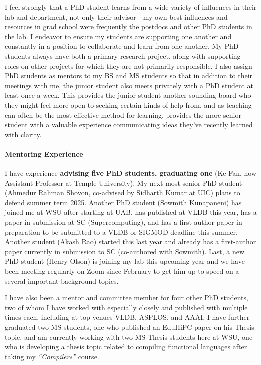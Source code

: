 \documentclass[12pt]{article}
\begin{document}
I feel strongly that a PhD student learns from a wide variety of influences in their lab and department, not only their advisor---my own best influences and resources in grad school were frequently the postdocs and other PhD students in the lab. I endeavor to ensure my students are supporting one another and constantly in a position to collaborate and learn from one another. My PhD students always have both a primary research project, along with supporting roles on other projects for which they are not primarily responsible. I also assign PhD students as mentors to my BS and MS students so that in addition to their meetings with me, the junior student also meets privately with a PhD student at least once a week. This provides the junior student another sounding board who they might feel more open to seeking certain kinds of help from, and as teaching can often be the most effective method for learning, provides the more senior student with a valuable experience communicating ideas they've recently learned with clarity.%

\paragraph{Mentoring Experience}

I have experience \textbf{advising five PhD students, graduating one} (Ke Fan, now Assistant Professor at Temple University). My next most senior PhD student (Ahmedur Rahman Shovon, co-advised by Sidharth Kumar at UIC) plans to defend summer term 2025. Another PhD student (Sowmith Kunapaneni) has joined me at WSU after starting at UAB, has published at VLDB this year, has a paper in submission at SC (Supercomputing), and has a first-author paper in preparation to be submitted to a VLDB or SIGMOD deadline this summer. Another student (Akash Rao) started this last year and already has a first-author paper currently in submission to SC (co-authored with Sowmith). Last, a new PhD student (Henry Olson) is joining my lab this upcoming year and we have been meeting regularly on Zoom since February to get him up to speed on a several important background topics.

I have also been a mentor and committee member for four other PhD students, two of whom I have worked with especially closely and published with multiple times each, including at top venues VLDB, ASPLOS, and AAAI. I have further graduated two MS students, one who published an EduHiPC paper on his Thesis topic, and am currently working with two MS Thesis students here at WSU, one who is developing a thesis topic related to compiling functional languages after taking my \emph{``Compilers''} course. %
\end{document}
